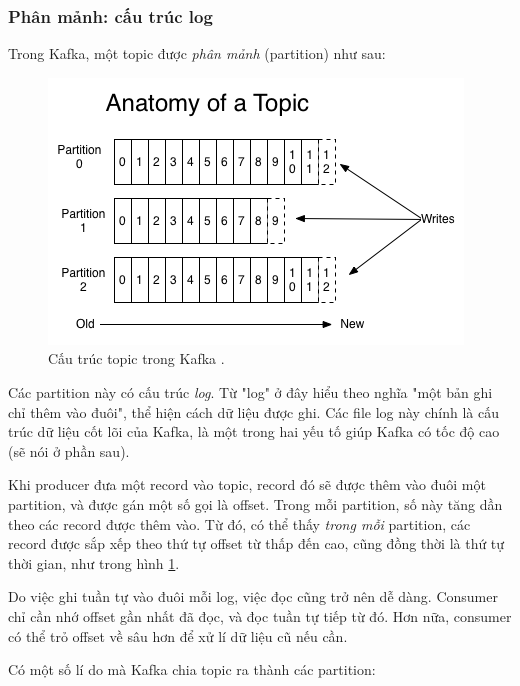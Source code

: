 \documentclass{article}
\begin{document}
\subsubsection{Phân mảnh: cấu trúc log}

Trong Kafka, một topic được \emph{phân mảnh} (partition) như sau:

\begin{figure}[H]
    \includegraphics[scale=0.5]{log_anatomy.png}
    \centering
    \caption{Cấu trúc topic trong Kafka \cite{kafka_intro}.}
    \label{log_anatomy}
\end{figure}

Các partition này có cấu trúc \emph{log}. Từ "log" ở đây hiểu theo nghĩa "một
bản ghi chỉ thêm vào đuôi", thể hiện cách dữ liệu được ghi. Các file log này
chính là cấu trúc dữ liệu cốt lõi của Kafka, là một trong hai yếu tố giúp Kafka
có tốc độ cao (sẽ nói ở phần sau).

Khi producer đưa một record vào topic, record đó sẽ được thêm vào đuôi một
partition, và được gán một số gọi là offset. Trong mỗi partition, số này tăng
dần theo các record được thêm vào. Từ đó, có thể thấy \emph{trong mỗi}
partition, các record được sắp xếp theo thứ tự offset từ thấp đến cao, cũng đồng
thời là thứ tự thời gian, như trong hình \ref{log_anatomy}.

Do việc ghi tuần tự vào đuôi mỗi log, việc đọc cũng trở nên dễ dàng. Consumer
chỉ cần nhớ offset gần nhất đã đọc, và đọc tuần tự tiếp từ đó. Hơn nữa, consumer
có thể trỏ offset về sâu hơn để xử lí dữ liệu cũ nếu cần.

Có một số lí do mà Kafka chia topic ra thành các partition:
\end{document}
